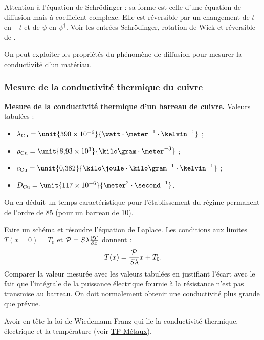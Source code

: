 \begin{remarque}
Attention à l'équation de Schrödinger : sa forme est celle d'une équation de diffusion mais à coefficient complexe.
Elle est réversible par un changement de $t$ en $-t$ et de $\psi$ en $\psi^\dagger$.
Voir les entrées Schrödinger, rotation de Wick et réversible de \cite{Taillet2018}.
\end{remarque}

\begin{transition}
On peut exploiter les propriétés du phénomène de diffusion pour mesurer la conductivité d'un matériau.
\end{transition}

\subsubsection{Mesure de la conductivité thermique du cuivre}

\begin{experience}
\textbf{Mesure de la conductivité thermique d'un barreau de cuivre.}
Valeurs tabulées : 
\begin{itemize}
\item $\lambda_\mathrm{Cu}=\unit{390\times 10^{-6}}{\watt\cdot\meter^{-1}\cdot\kelvin^{-1}}$ ;
\item $\rho_\mathrm{Cu} = \unit{8{,}93\times10^3}{\kilo\gram\cdot\meter^{-3}}$ ;
\item $c_\mathrm{Cu} = \unit{0{,}382}{\kilo\joule\cdot\kilo\gram^{-1}\cdot\kelvin^{-1}}$ ;
\item $D_\mathrm{Cu} = \unit{117\times10^{-6}}{\meter^2\cdot\second^{-1}}$.  
\end{itemize}
On en déduit un temps caractéristique pour l'établissement du régime permanent de l'ordre de \unit{85}{\second} (pour un barreau de \unit{10}{\centi\meter}).
\end{experience}

Faire un schéma et résoudre l'équation de Laplace.
Les conditions aux limites $T(x=0)=T_0$ et ${\cal{P}}=S\lambda\frac{\partial T}{\partial x}$ donnent :
\begin{equation}
T(x) = \frac{\cal{P}}{S\lambda} x + T_0.
\end{equation}
Comparer la valeur mesurée avec les valeurs tabulées en justifiant l'écart avec le fait que l'intégrale de la puissance électrique fournie à la résistance n'est pas transmise au barreau.
On doit normalement obtenir une conductivité plus grande que prévue.

\begin{remarque}
Avoir en tête la loi de Wiedemann-Franz qui lie la conductivité thermique, électrique et la température (voir \href{http://ressources.agreg.phys.ens.fr/ressources/}{TP Métaux}).
\end{remarque}


